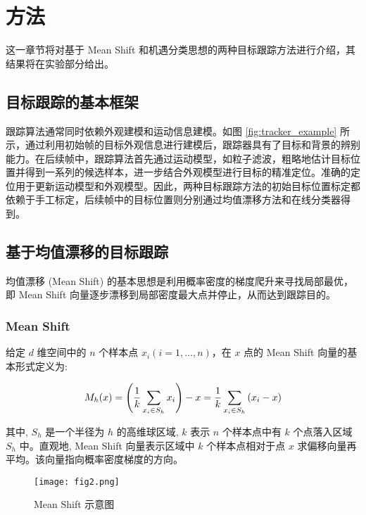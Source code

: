 \section{方法} 
\label{sec:proposed}

这一章节将对基于 Mean Shift 和机遇分类思想的两种目标跟踪方法进行介绍，其结果将在实验部分给出。

\subsection{目标跟踪的基本框架}

跟踪算法通常同时依赖外观建模和运动信息建模。如图 \ref{fig:tracker_example} 所示，通过利用初始帧的目标外观信息进行建模后，跟踪器具有了目标和背景的辨别能力。在后续帧中，跟踪算法首先通过运动模型，如粒子滤波，粗略地估计目标位置并得到一系列的候选样本，进一步结合外观模型进行目标的精准定位。准确的定位用于更新运动模型和外观模型。因此，两种目标跟踪方法的初始目标位置标定都依赖于手工标定，后续帧中的目标位置则分别通过均值漂移方法和在线分类器得到。

\subsection{基于均值漂移的目标跟踪}

均值漂移 (Mean Shift) 的基本思想是利用概率密度的梯度爬升来寻找局部最优，即 Mean Shift 向量逐步漂移到局部密度最大点并停止，从而达到跟踪目的。

\subsubsection{Mean Shift}

给定 $d$ 维空间中的 $n$ 个样本点 $x_i(i=1, \ldots, n)$，在 $x$ 点的 Mean Shift 向量的基本形式定义为:
\vspace{0.5cm}

\begin{equation}
M_h(x)=\left(\frac{1}{k} \sum_{x_i \in S_h} x_i\right)-x=\frac{1}{k} \sum_{x_i \in S_h}\left(x_i-x\right)
\vspace{0.5cm}
\end{equation}

其中, $S_h$ 是一个半径为 $h$ 的高维球区域, $k$ 表示 $n$ 个样本点中有 $k$ 个点落入区域 $S_h$ 中。直观地, Mean Shift 向量表示区域中 $k$ 个样本点相对于点 $x$ 求偏移向量再平均。该向量指向概率密度梯度的方向。

\begin{figure}[!ht]
	\center
	\texttt{[image: fig2.png]}
	\caption{Mean Shift 示意图}
	\label{fig:meanshift}
\end{figure}

